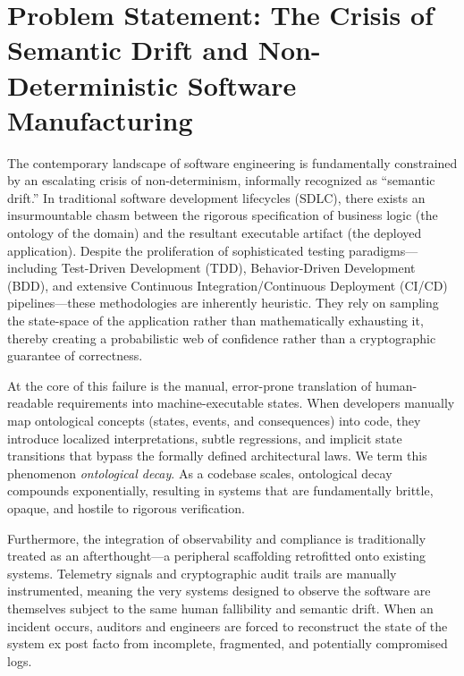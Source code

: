 \section{Problem Statement: The Crisis of Semantic Drift and Non-Deterministic Software Manufacturing}
\label{sec:problem_statement}

The contemporary landscape of software engineering is fundamentally constrained by an escalating crisis of non-determinism, informally recognized as ``semantic drift.'' In traditional software development lifecycles (SDLC), there exists an insurmountable chasm between the rigorous specification of business logic (the ontology of the domain) and the resultant executable artifact (the deployed application). Despite the proliferation of sophisticated testing paradigms—including Test-Driven Development (TDD), Behavior-Driven Development (BDD), and extensive Continuous Integration/Continuous Deployment (CI/CD) pipelines—these methodologies are inherently heuristic. They rely on sampling the state-space of the application rather than mathematically exhausting it, thereby creating a probabilistic web of confidence rather than a cryptographic guarantee of correctness.

At the core of this failure is the manual, error-prone translation of human-readable requirements into machine-executable states. When developers manually map ontological concepts (states, events, and consequences) into code, they introduce localized interpretations, subtle regressions, and implicit state transitions that bypass the formally defined architectural laws. We term this phenomenon \textit{ontological decay}. As a codebase scales, ontological decay compounds exponentially, resulting in systems that are fundamentally brittle, opaque, and hostile to rigorous verification.

Furthermore, the integration of observability and compliance is traditionally treated as an afterthought—a peripheral scaffolding retrofitted onto existing systems. Telemetry signals and cryptographic audit trails are manually instrumented, meaning the very systems designed to observe the software are themselves subject to the same human fallibility and semantic drift. When an incident occurs, auditors and engineers are forced to reconstruct the state of the system ex post facto from incomplete, fragmented, and potentially compromised logs. 

